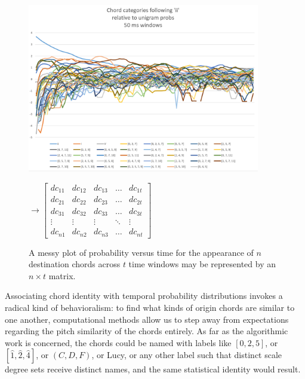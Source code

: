 \begin{figure}
\caption{A messy plot of probability versus time for the appearance of $n$ destination chords across $t$ time windows may be represented by an $n \times t$ matrix.}
	\begin{minipage}{4in}
	\includegraphics[width=4in]{ii_messy.png}
	\end{minipage}
	\begin{minipage}[r]{2in}
	{${
	\boldsymbol{\longrightarrow}
	\begin{bmatrix}
		dc_{11} & dc_{12} & dc_{13} & \dots  & dc_{1t} \\
		dc_{21} & dc_{22} & dc_{23} & \dots  & dc_{2t} \\
		dc_{31} & dc_{32} & dc_{33} & \dots  & dc_{3t} \\
		\vdots 	& \vdots  & \vdots  & \ddots & \vdots  \\
		dc_{n1} & dc_{n2} & dc_{n3} & \dots  & dc_{nt}
	\end{bmatrix}
	}$}
	\end{minipage}
\label{plotToMat}
\end{figure}

Associating chord identity with temporal probability distributions invokes a radical kind of behavioralism: to find what kinds of origin chords are similar to one another, computational methods allow us to step away from expectations regarding the pitch similarity of the chords entirely.  As far as the algorithmic work is concerned, the chords could be named with labels like $[0,2,5]$, or $[\hat{1},\hat{2},\hat{4}]$, or $(C,D,F)$, or Lucy, or any other label such that distinct scale degree sets receive distinct names, and the same statistical identity would result.

